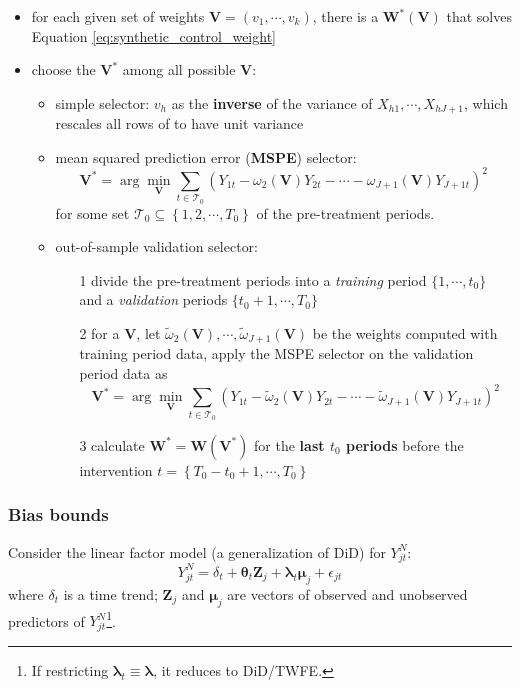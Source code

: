 \documentclass[twoside]{article}
\begin{document}
\begin{itemize}
    \item for each given set of weights $\mathbf{V}=\left(v_1,\cdots,v_k\right)$, there is a $\mathbf{W}^*\left(\mathbf{V}\right)$ that solves Equation \ref{eq:synthetic_control_weight}
    \item choose the $\mathbf{V}^*$ among all possible $\mathbf{V}$:
    \begin{itemize}
        \item simple selector: $v_h$ as the \textbf{inverse} of the variance of $X_{h1},\cdots,X_{hJ+1}$, which rescales all rows of to have unit variance
        \item mean squared prediction error (\textbf{MSPE}) selector:
        \begin{equation*}
            \mathbf{V}^* = \arg\min_{\mathbf{V}} \sum_{t\in\mathcal{T}_0} \left( Y_{1t}-\omega_2\left(\mathbf{V}\right)Y_{2t} - \cdots - \omega_{J+1}\left(\mathbf{V}\right)Y_{J+1t} \right)^2
        \end{equation*}
        for some set $\mathcal{T}_0\subseteq \left\{1,2,\cdots,T_0\right\}$ of the pre-treatment periods.
        \item out-of-sample validation selector: 
        \begin{itemize}
            \item[1] divide the pre-treatment periods into a \textit{training} period $\{1,\cdots,t_0\}$ and a \textit{validation} periods $\{t_0+1,\cdots,T_0\}$
            \item[2] for a $\mathbf{V}$, let $\tilde{\omega}_2\left(\mathbf{V}\right),\cdots,\tilde{\omega}_{J+1}\left(\mathbf{V}\right)$ be the weights computed with training period data, apply the MSPE selector on the validation period data as $$ \mathbf{V}^* = \arg\min_{\mathbf{V}} \sum_{t\in\mathcal{T}_0} \left( Y_{1t}-\tilde{\omega}_2\left(\mathbf{V}\right)Y_{2t} - \cdots - \tilde{\omega}_{J+1}\left(\mathbf{V}\right)Y_{J+1t} \right)^2 $$
            \item[3] calculate $\mathbf{W}^* = \mathbf{W}\left(\mathbf{V}^*\right)$ for the \textbf{last $t_0$ periods} before the intervention $t=\left\{T_0-t_0+1,\cdots,T_0\right\}$ 
        \end{itemize}
    \end{itemize}
\end{itemize}

\subsubsection{Bias bounds}
Consider the linear factor model (a generalization of DiD) for $Y_{jt}^N$: $$ Y_{jt}^N = \delta_t + \boldsymbol{\theta}_t\mathbf{Z}_j + \boldsymbol{\lambda}_t \boldsymbol{\mu}_j + \epsilon_{jt} $$
where $\delta_t$ is a time trend; $\mathbf{Z}_j$ and $\boldsymbol{\mu}_j$ are vectors of observed and unobserved predictors of $Y^N_{jt}$\footnote{If restricting $\boldsymbol{\lambda}_t\equiv \boldsymbol{\lambda}$, it reduces to DiD/TWFE.}.
\end{document}
